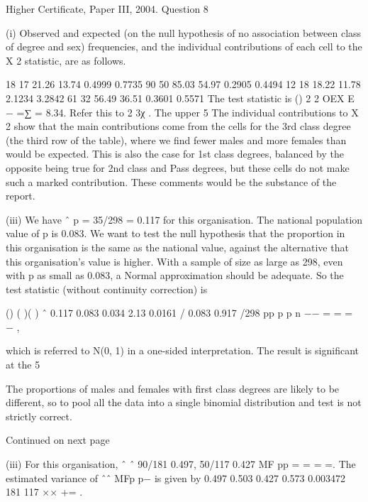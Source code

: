 \documentclass[a4paper,12pt]{article}
\begin{document}
Higher Certificate, Paper III, 2004.  Question 8 
 
 
(i) Observed and expected (on the null hypothesis of no association between class of degree and sex) frequencies, and the individual contributions of each cell to the X 2 statistic, are as follows. 
 
18 17   21.26 13.74   0.4999 0.7735 90 50   85.03 54.97   0.2905 0.4494 12 18   18.22 11.78   2.1234 3.2842 61 32   56.49 36.51   0.3601 0.5571 
 The test statistic is () 2 2 OEX E − =∑ = 8.34.  Refer this to 2 3χ .  The upper 5%
 The individual contributions to X 2 show that the main contributions come from the cells for the 3rd class degree (the third row of the table), where we find fewer males and more females than would be expected.  This is also the case for 1st class degrees, balanced by the opposite being true for 2nd class and Pass degrees, but these cells do not make such a marked contribution.  These comments would be the substance of the report. 
 
 
(iii) We have ˆ p = 35/298 = 0.117 for this organisation.  The national population value of p is 0.083.  We want to test the null hypothesis that the proportion in this organisation is the same as the national value, against the alternative that this organisation's value is higher.  With a sample of size as large as 298, even with p as small as 0.083, a Normal approximation should be adequate.  So the test statistic (without continuity correction) is 
 
() ( )( ) ˆ 0.117 0.083 0.034 2.13 0.0161 / 0.083 0.917 /298 pp p p n −− = = = − , 
 
which is referred to N(0, 1) in a one-sided interpretation.  The result is significant at the 5%
 
The proportions of males and females with first class degrees are likely to be different, so to pool all the data into a single binomial distribution and test is not strictly correct. 
 
 
 
 
 
Continued on next page 

 
 
(iii) For this organisation, ˆ ˆ 90/181 0.497, 50/117 0.427 MF pp = = = =.  The estimated variance of ˆˆ MFp p− is given by 
 0.497 0.503 0.427 0.573 0.003472 181 117 ×× += . 
 
\end{document}
